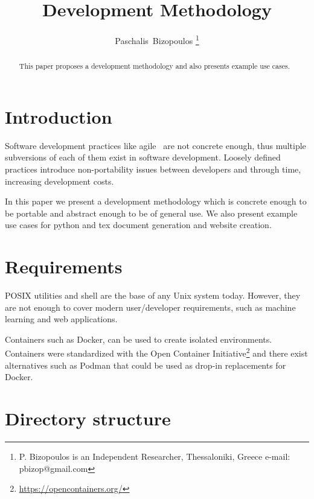 \documentclass[journal]{IEEEtran}
\begin{document}
\title{Development Methodology}

\author{Paschalis~Bizopoulos
\thanks{P. Bizopoulos is an Independent Researcher, Thessaloniki, Greece e-mail: pbizop@gmail.com}}

\maketitle

\begin{abstract}
	This paper proposes a development methodology and also presents example use cases.
\end{abstract}

\section{Introduction}
Software development practices like agile~\cite{abrahamsson2017agile} are not concrete enough, thus multiple subversions of each of them exist in software development.
Loosely defined practices introduce non-portability issues between developers and through time, increasing development costs.

In this paper we present a development methodology which is concrete enough to be portable and abstract enough to be of general use.
We also present example use cases for python and tex document generation and website creation.

\section{Requirements}
POSIX utilities and shell are the base of any Unix system today.
However, they are not enough to cover modern user/developer requirements, such as machine learning and web applications.

Containers such as Docker, can be used to create isolated environments.
Containers were standardized with the Open Container Initiative\footnote{\url{https://opencontainers.org/}} and there exist alternatives such as Podman that could be used as drop-in replacements for Docker.

\section{Directory structure}
\end{document}
